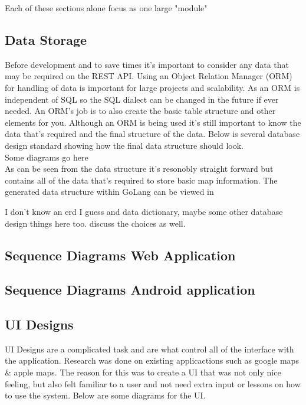 Each of these sections alone focus as one large "module" 

\subsection{Data Storage}
Before development and to save times it's important to consider any data that may be required on the REST API. Using an Object Relation Manager (ORM) for handling of data is important for large projects and scalability. As an ORM is independent of SQL so the SQL dialect can be changed in the future if ever needed. An ORM's job is to also create the basic table structure and other elements for you. Although an ORM is being used it's still important to know the data that's required and the final structure of the data. Below is several database design standard showing how the final data structure should look.
\\
Some diagrams go here
\\
As can be seen from the data structure it's resonobly straight forward but contains all of the data that's required to store basic map information. The generated data structure within GoLang can be viewed in \appendixtemp

I don't know an erd I guess and data dictionary, maybe some other database design things here too. discuss the choices as well.

\subsection{Sequence Diagrams Web Application}

\subsection{Sequence Diagrams Android application}

\subsection{UI Designs}
UI Designs are a complicated task and are what control all of the interface with the application. Research was done on existing applicactions such as google maps \& apple maps. The reason for this was to create a UI that was not only nice feeling, but also felt familiar to a user and not need extra input or lessons on how to use the system. Below are some diagrams for the UI.